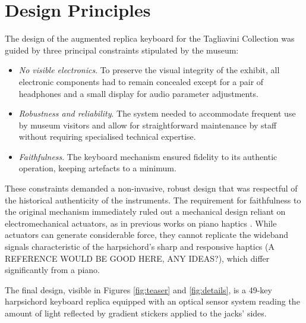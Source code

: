 \section{Design Principles}\label{design}


The design of the augmented replica keyboard for the Tagliavini Collection was guided by three principal constraints stipulated by the museum:
\begin{itemize}
\item \emph{No visible electronics}. To preserve the visual integrity of the exhibit, all electronic components had to remain concealed except for a pair of headphones and a small display for audio parameter adjustments.
\item \emph{Robustness and reliability}. The system needed to accommodate frequent use by museum visitors and allow for straightforward maintenance by staff without requiring specialised technical expertise.
\item \emph{Faithfulness}. The keyboard mechanism ensured fidelity to its authentic operation, keeping artefacts to a minimum. 
\end{itemize}
These constraints demanded a non-invasive, robust design that was respectful of the historical authenticity of the instruments. The requirement for faithfulness to the original mechanism immediately ruled out a mechanical design reliant on electromechanical actuators, as in previous works on piano haptics \cite{Timmermans2020,Gillespie1996}. While actuators can generate considerable force, they cannot replicate the wideband signals characteristic of the harpsichord's sharp and responsive haptics (A REFERENCE WOULD BE GOOD HERE, ANY IDEAS?), which differ significantly from a piano.




The final design, visible in Figures \ref{fig:teaser} and \ref{fig:details}, is a 49-key harpsichord keyboard replica equipped with an optical sensor system reading the amount of light reflected by gradient stickers applied to the jacks' sides. 



